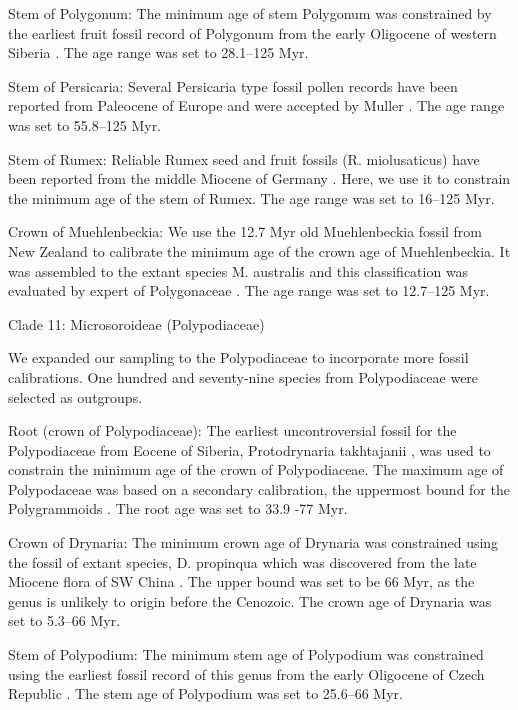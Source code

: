\documentclass[10pt]{article}
\begin{document}
Stem of Polygonum: The minimum age of stem Polygonum was constrained
by the earliest fruit fossil record of Polygonum from the early
Oligocene of western Siberia \citep{Dorofeev 1963}. The age range was
set to 28.1--125 Myr.

Stem of Persicaria: Several Persicaria type fossil pollen records have
been reported from Paleocene of Europe \citep{Krutzsch 1970,
  Gruas-Cavagnetto 1978} and were accepted by Muller \citep{Muller
  1981}. The age range was set to 55.8--125 Myr.

Stem of Rumex: Reliable Rumex seed and fruit fossils (R. miolusaticus)
have been reported from the middle Miocene of Germany \citep{Mai
  2001}. Here, we use it to constrain the minimum age of the stem of
Rumex. The age range was set to 16--125 Myr.

Crown of Muehlenbeckia: We use the 12.7 Myr old Muehlenbeckia fossil
from New Zealand \citep{Pole 1993} to calibrate the minimum age of the
crown age of Muehlenbeckia. It was assembled to the extant species
M. australis \citep{Pole 1993} and this classification was evaluated
by expert of Polygonaceae \citep{Schuster, Setaro et al. 2013}. The
age range was set to 12.7--125 Myr.

Clade 11: Microsoroideae (Polypodiaceae)

We expanded our sampling to the Polypodiaceae to incorporate more
fossil calibrations. One hundred and seventy-nine species from
Polypodiaceae were selected as outgroups. 

Root (crown of Polypodiaceae): The earliest uncontroversial fossil for
the Polypodiaceae from Eocene of Siberia, Protodrynaria takhtajanii
\citep{Vikulin and Bobrov 1987}, was used to constrain the minimum age
of the crown of Polypodiaceae. The maximum age of Polypodaceae was
based on a secondary calibration, the uppermost bound for the
Polygrammoids \citep{Schuettpelz and Pryer 2009}. The root age was set
to 33.9 -77 Myr.

Crown of Drynaria: The minimum crown age of Drynaria was constrained
using the fossil of extant species, D. propinqua which was discovered
from the late Miocene flora of SW China \citep{Wen, Xie et
  al. 2013}. The upper bound was set to be 66 Myr, as the genus is
unlikely to origin before the Cenozoic. The crown age of Drynaria was
set to 5.3--66 Myr.

Stem of Polypodium: The minimum stem age of Polypodium was constrained
using the earliest fossil record of this genus from the early
Oligocene of Czech Republic \citep{Kvacek 2001}. The stem age of
Polypodium was set to 25.6--66 Myr.
\end{document}
